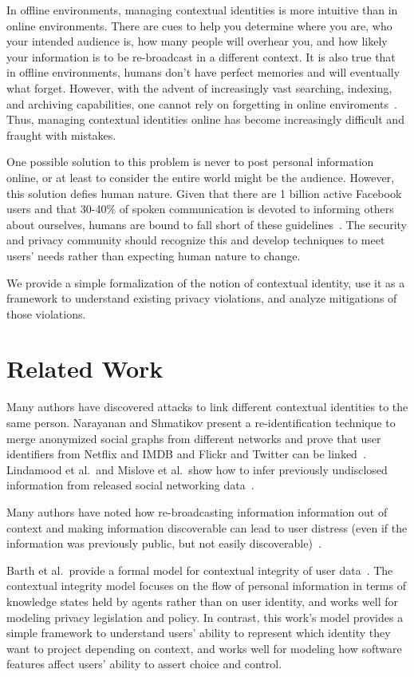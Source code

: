 \documentclass{llncs}
\begin{document}
In offline environments, managing contextual identities is more intuitive than
in online environments. There are cues to help you determine where you are,
who your intended audience is, how many people will overhear you, and how
likely your information is to be re-broadcast in a different context. It is
also true that in offline environments, humans don't have perfect memories and
will eventually what forget.  However, with the advent of increasingly vast
searching, indexing, and archiving capabilities, one cannot rely on forgetting
in online enviroments~\cite{delete}. Thus, managing contextual identities 
online has become increasingly difficult and fraught with mistakes.

One possible solution to this problem is never to post personal information
online, or at least to consider the entire world might be the audience.
However, this solution defies human nature. Given that there are 1 billion
active Facebook users and that 30-40\% of spoken communication is devoted to
informing others about ourselves, humans are bound to fall short of these
guidelines~\cite{tamir,fbusers}. The security and privacy community should
recognize this and develop techniques to meet users' needs rather than
expecting human nature to change.

We provide a simple formalization of the notion of contextual identity, use it as a
framework to understand existing privacy violations, and analyze mitigations of
those violations.

\section{Related Work}

Many authors have discovered attacks to link different contextual identities to
the same person. Narayanan and Shmatikov present a re-identification technique
to merge anonymized social graphs from different networks and prove that
user identifiers from Netflix and IMDB and Flickr and Twitter can be
linked~\cite{narayanan1,narayanan2}. Lindamood et al.~and Mislove et al.~show
how to infer previously undisclosed information from released social networking
data~\cite{lindamood,mislove}.

Many authors have noted how re-broadcasting information information out of
context and making information discoverable can lead to user distress (even if
the information was previously public, but not easily
discoverable)~\cite{boyd1,chew,nissenbaum}.

Barth et al.~provide a formal model for contextual integrity of user
data~\cite{barth}. The contextual integrity model focuses on the flow of
personal information in terms of knowledge states held by agents rather than on
user identity, and works well for modeling privacy legislation and policy. In
contrast, this work's model provides a simple framework to understand users' ability
to represent which identity they want to project depending on context, and works
well for modeling how software features affect users' ability to assert choice
and control.
\end{document}
